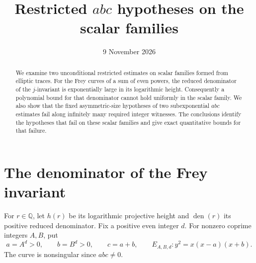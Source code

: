\documentclass[11pt,a4paper]{article}
\title{Restricted $abc$ hypotheses on the scalar families}
\author{}\date{9 November 2026}
\newcommand{\Q}{\mathbb Q}\newcommand{\Z}{\mathbb Z}
\DeclareMathOperator{\den}{den}
\begin{document}
\maketitle
\begin{abstract}
We examine two unconditional restricted estimates on scalar families
formed from elliptic traces. For the Frey curves of a sum of even
powers, the reduced denominator of the $j$-invariant is exponentially
large in its logarithmic height. Consequently a polynomial bound for
that denominator cannot hold uniformly in the scalar family. We also
show that the fixed asymmetric-size hypotheses of two subexponential
$abc$ estimates fail along infinitely many required integer witnesses.
The conclusions identify the hypotheses that fail on these scalar
families and give exact quantitative bounds for that failure.
\end{abstract}

\section{The denominator of the Frey invariant}

For $r\in\Q$, let $h(r)$ be its logarithmic projective height and
$\den(r)$ its positive reduced denominator. Fix a positive even integer
$d$. For nonzero coprime integers $A,B$, put
\[
 a=A^d>0,\qquad b=B^d>0,\qquad c=a+b,
 \qquad E_{A,B,d}:y^2=x(x-a)(x+b).
\]
The curve is nonsingular since $abc\ne0$.
\end{document}
